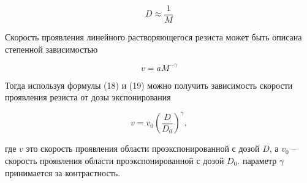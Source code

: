 \begin{equation}
D\approx \frac{1}{M}
\label{eq:A18}
\end{equation}

Скорость проявления линейного растворяющегося резиста может быть описана степенной зависимостью \cite{16,22,23}

\begin{equation}
v=aM^{-\gamma}
\label{eq:A19}
\end{equation}

Тогда используя формулы (18) и (19) можно получить зависимость скорости проявления резиста от дозы экспонирования 

\begin{equation}
v=v_0\left(\frac{D}{D_0}\right)^\gamma,
\label{eq:A20}
\end{equation}

где $v$ это скорость проявления области проэкспонированной с дозой $D$, а $v_0$ -- скорость проявления области проэкспонированной с дозой $D_0$. параметр $\gamma$ принимается за контрастность. 

